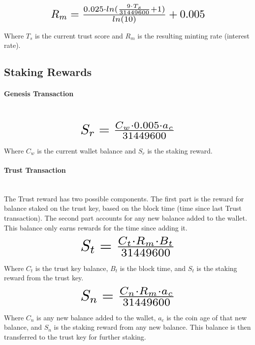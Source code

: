 \documentclass[11pt]{article}
\begin{document}
\begin{equation}
\resizebox{.65\hsize}{!}{$R_{m} = \frac{0.025 \cdot ln(\frac{9 \cdot T_{s}}{31449600} + 1)}{ln(10)} + 0.005$}
\end{equation}

\noindent Where $T_{s}$ is the current trust score and $R_{m}$ is the resulting minting rate (interest rate).\\


\subsection{Staking Rewards}
\paragraph{Genesis Transaction} ~\\
\begin{equation}
\resizebox{.40\hsize}{!}{$S_{r} = \frac{C_{w} \cdot 0.005 \cdot a_c}{31449600}$}
\end{equation}

\noindent Where $C_{w}$ is the current wallet balance and $S_{r}$ is the staking reward.

\paragraph{Trust Transaction} ~\\
The Trust reward has two possible components. The first part is the reward for balance staked on the trust key, based on the block time (time since last Trust transaction). The second part accounts for any new balance added to the wallet. This balance only earns rewards for the time since adding it.\\

\begin{equation}
\resizebox{.40\hsize}{!}{$S_{t} = \frac{C_{t} \cdot R_{m} \cdot B_{t}}{31449600}$}
\end{equation}

\noindent Where $C_{t}$ is the trust key balance, $B_{t}$ is the block time, and $S_{t}$ is the staking reward from the trust key.\\

\begin{equation}
\resizebox{.40\hsize}{!}{$S_{n} = \frac{C_{n} \cdot R_{m} \cdot a_c}{31449600}$}
\end{equation}

\noindent Where $C_{n}$ is any new balance added to the wallet, $a_c$ is the coin age of that new balance, and $S_{n}$ is the staking reward from any new balance. This balance is then transferred to the trust key for further staking.\\
\end{document}
